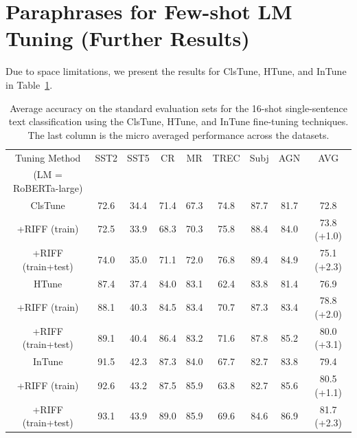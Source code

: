 \documentclass[11pt]{article}
\begin{document}
\section{Paraphrases for Few-shot LM Tuning (Further Results)}
\label{lm-tuning-extra:appendix}
Due to space limitations, we present the results for ClsTune, HTune, and InTune in Table~\ref{RIFF-vs-main-16-shot-rest}.
\begin{table}
\centering
\caption{Average accuracy on the standard evaluation sets for the 16-shot single-sentence text classification using the ClsTune, HTune, and InTune fine-tuning techniques. The last column is the micro averaged performance across the datasets.}

\begin{tabular}{c | c | c | c | c | c | c | c || c }
\hline
Tuning Method & SST2 & SST5 & CR & MR & TREC & Subj & AGN & AVG \\
\small(LM = RoBERTa-large) &  &  &  &  &  &  &  & \\
\hline
\small ClsTune & \small72.6 & \small34.4 & \small71.4 & \small67.3 & \small74.8 & \small87.7 & \small 81.7 & \small72.8 \\
\tiny+RIFF (train)  & \small72.5 & \small33.9 & \small68.3 & \small70.3 & \small75.8 & \small88.4 & \small 84.0 &\;\;\;\;\;\;\;\;\small73.8 (+1.0) \\
\tiny+RIFF (train+test)  & \small74.0 & \small35.0 & \small71.1 & \small72.0 & \small76.8 &\small 89.4 & \small 84.9 &\;\;\;\;\;\;\;\;\small75.1 (+2.3)\\
\hline
\small HTune & \small87.4 & \small37.4 & \small84.0 & \small83.1 & \small62.4 & \small83.8 & \small 81.4 & \small76.9 \\
\tiny+RIFF (train) & \small88.1 & \small40.3 & \small84.5 & \small83.4 & \small70.7 & \small87.3 & \small 83.4 &\;\;\;\;\;\;\;\;\small78.8 (+2.0) \\
\tiny+RIFF (train+test) & \small89.1 & \small40.4 & \small86.4 & \small83.2 & \small71.6 & \small87.8 & \small 85.2 &\;\;\;\;\;\;\;\;\small80.0 (+3.1) \\
\hline
\small InTune & \small91.5 & \small42.3 & \small87.3 & \small84.0 & \small67.7 & \small82.7 & \small 83.8 & \small79.4 \\
\tiny+RIFF (train) & \small92.6 & \small43.2 & \small87.5 & \small85.9 & \small63.8 & \small82.7 & \small 85.6 &\;\;\;\;\;\;\;\;\small80.5 (+1.1) \\
\tiny+RIFF (train+test) & \small93.1 & \small43.9 & \small89.0 & \small85.9 & \small69.6 & \small84.6 & \small 86.9 &\;\;\;\;\;\;\;\;\small81.7 (+2.3)\\
\hline
\end{tabular}
\label{RIFF-vs-main-16-shot-rest}
\end{table}
\end{document}
